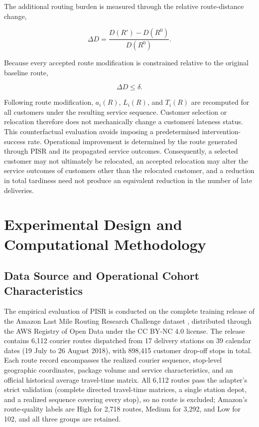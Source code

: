 \documentclass[11pt,a4paper]{article}
\begin{document}
The additional routing burden is measured through the relative
route-distance change,

\begin{equation}
\Delta D = \frac{D\left( R' \right) - D\left( R^{0} \right)}{D\left( R^{0} \right)}.
\label{eq:21}
\end{equation}

Because every accepted route modification is constrained relative to the
original baseline route,

\begin{equation}
\Delta D \leq \delta.
\label{eq:22}
\end{equation}

Following route modification, \(a_{i}(R)\), \(L_{i}(R)\), and
\(T_{i}(R)\) are recomputed for all customers under the resulting
service sequence. Customer selection or relocation therefore does not
mechanically change a customer\'s lateness status. This
counterfactual evaluation avoids imposing a predetermined
intervention-success rate. Operational improvement is determined by the
route generated through PISR and its propagated service outcomes.
Consequently, a selected customer may not ultimately be relocated, an
accepted relocation may alter the service outcomes of customers other
than the relocated customer, and a reduction in total tardiness need not
produce an equivalent reduction in the number of late deliveries.

\section{Experimental Design and Computational Methodology}\label{sec:experimental-design}

\subsection{Data Source and Operational Cohort Characteristics}\label{sec:data-cohort}
The empirical evaluation of PISR is conducted on the complete training release of the Amazon Last Mile Routing Research Challenge dataset \cite{merchan2024}, distributed through the AWS Registry of Open Data under the CC BY-NC 4.0 license. The release contains 6,112 courier routes dispatched from 17 delivery stations on 39 calendar dates (19 July to 26 August 2018), with 898,415 customer drop-off stops in total. Each route record encompasses the realized courier sequence, stop-level geographic coordinates, package volume and service characteristics, and an official historical average travel-time matrix. All 6,112 routes pass the adapter's strict validation (complete directed travel-time matrices, a single station depot, and a realized sequence covering every stop), so no route is excluded; Amazon's route-quality labels are High for 2,718 routes, Medium for 3,292, and Low for 102, and all three groups are retained.
\end{document}
